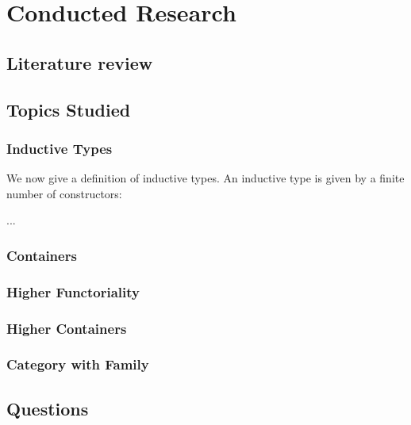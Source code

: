 \chapter{Conducted Research}

\section{Literature review}

\section{Topics Studied}

\subsection{Inductive Types}

We now give a definition of inductive types. An inductive type  is given by a finite number of constructors:

\AgdaSpace{}%
\AgdaSpace{}%
\AgdaSymbol{:}\AgdaSpace{}%
\AgdaSpace{}%
%

\AgdaSymbol{:}\AgdaSpace{}
\AgdaSpace{}
\AgdaSpace{}
\AgdaSpace{}
\AgdaSpace{}
...
\AgdaSpace{}


\subsection{Containers}

\subsection{Higher Functoriality}

\subsection{Higher Containers}

\subsection{Category with Family}

\section{Questions}
